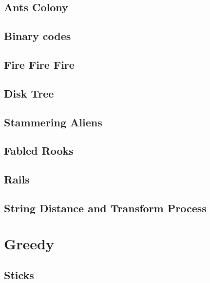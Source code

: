         \subsection{Ants Colony}
                
        \subsection{Binary codes}        
                
        \subsection{Fire Fire Fire}        
                
        \subsection{Disk Tree}        
                
        \subsection{Stammering Aliens}        
                
        \subsection{Fabled Rooks}        
                
        \subsection{Rails}        
                
        \subsection{String Distance and Transform Process}        
                

\section{Greedy}
        \subsection{Sticks}
                

